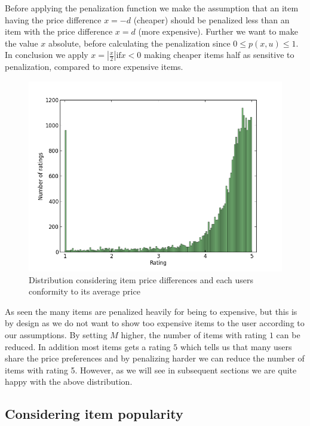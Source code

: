Before applying the penalization function we make the assumption that an item
having the price difference $x = -d$ (cheaper) should be penalized less than an
item with the price difference $x = d$ (more expensive). Further we want to
make the value $x$ absolute, before calculating the penalization since $0 \leq
p(x,u) \leq 1$. In conclusion we apply $x = |\frac{x}{2}| \text{if} x < 0$
making cheaper items half as sensitive to penalization, compared to more
expensive items.

\begin{figure}[H]
  \centering
  \includegraphics[scale=0.5]{image/dist-price}
  \caption{Distribution considering item price differences and each users conformity to
  its average price}
  \label{fig:dist-price}
\end{figure}

As seen the many items are penalized heavily for being to expensive, but this
is by design as we do not want to show too expensive items to the user
according to our assumptions. By setting $M$ higher, the number of items with
rating $1$ can be reduced. In addition most items gets a rating $5$ which tells
us that many users share the price preferences and by penalizing harder we can
reduce the number of items with rating 5. However, as we will see in subsequent
sections we are quite happy with the above distribution.

\subsection{Considering item popularity}


